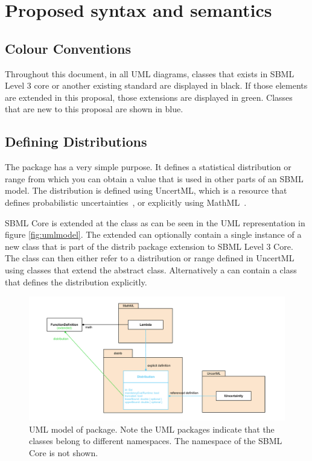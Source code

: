 \documentclass[draftspec]{sbmlpkgspec}
\begin{document}
\section{Proposed syntax and semantics}

\subsection{Colour Conventions}

Throughout this document, in all UML diagrams, classes that exists in
SBML Level 3 core or another existing standard are displayed in
black. If those elements are extended in this proposal, those
extensions are displayed in green. Classes that are new to this
proposal are shown in blue.

\subsection{Defining Distributions}

The \distrib package has a very simple purpose. It defines a
statistical distribution or range from which you can obtain a value
that is used in other parts of an SBML model. The distribution is
defined using UncertML, which is a resource that defines probabilistic
uncertainties~\cite{uncertml}, or explicitly using MathML~\cite{mathml2}.

SBML Core is extended at the \FunctionDefinition class as can be seen
in the UML representation in figure \vref{fig:umlmodel}. The extended
\FunctionDefinition can optionally contain a single instance of a new
class  that is part of the distrib package
extension to SBML Level 3 Core. The  class can
then either refer to a distribution or range defined in UncertML using
classes that extend the \unidistrib abstract class. Alternatively a
 can contain a \mlambda class that defines the
distribution explicitly.

\begin{figure}[htb]
\includegraphics[width=0.8\linewidth]{DistribUMLModel.pdf}
\caption{UML model of \distrib package. Note the UML packages
  indicate that the classes belong to different namespaces. The
  namespace of the SBML Core is not shown.}
\label{fig:umlmodel}
\end{figure}
\end{document}
